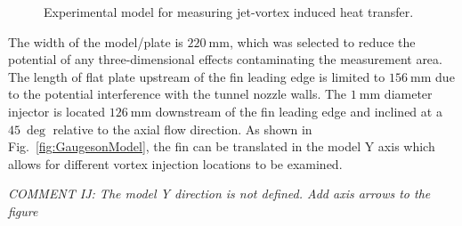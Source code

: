 \documentclass{AIAA}
\begin{document}
%
\begin{figure}[!h]
\center
{}
\caption{Experimental model for measuring jet-vortex induced heat transfer.}
\label{fig:ModelPics}
\end{figure} 


The width of the model/plate is $\SI{220}{\milli\meter}$, which was selected to reduce the potential of any three-dimensional effects contaminating the measurement area.
The length of flat plate upstream of the fin leading edge is limited to $\SI{156}{\milli\meter}$ due to the potential interference with the tunnel nozzle walls.
The $\SI{1}{\milli\meter}$ diameter injector is located $\SI{126}{\milli\meter}$ downstream of the fin leading edge and inclined at a $\SI{45}{\deg}$ relative to the axial flow direction.
As shown in Fig.~\ref{fig:GaugesonModel}, the fin can be translated in the model Y axis
which allows for different vortex injection locations to be examined. 

{\it COMMENT IJ:  The model Y direction is not defined. Add axis arrows to the figure }
\end{document}
